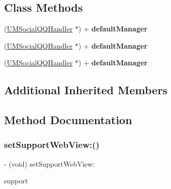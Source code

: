 \subsection*{Class Methods}
\begin{DoxyCompactItemize}
\item 
\mbox{\label{interface_u_m_social_q_q_handler_a1d401828e5744439d8303fde08266051}} 
(\mbox{\hyperlink{interface_u_m_social_q_q_handler}{U\+M\+Social\+Q\+Q\+Handler}} $\ast$) + {\bfseries default\+Manager}
\item 
\mbox{\label{interface_u_m_social_q_q_handler_a1d401828e5744439d8303fde08266051}} 
(\mbox{\hyperlink{interface_u_m_social_q_q_handler}{U\+M\+Social\+Q\+Q\+Handler}} $\ast$) + {\bfseries default\+Manager}
\item 
\mbox{\label{interface_u_m_social_q_q_handler_a1d401828e5744439d8303fde08266051}} 
(\mbox{\hyperlink{interface_u_m_social_q_q_handler}{U\+M\+Social\+Q\+Q\+Handler}} $\ast$) + {\bfseries default\+Manager}
\end{DoxyCompactItemize}
\subsection*{Additional Inherited Members}


\subsection{Method Documentation}
\mbox{\label{interface_u_m_social_q_q_handler_a22e62d8b1b36ab0cef2e16e2377f2b1e}} 
\subsubsection{\texorpdfstring{set\+Support\+Web\+View\+:()}{setSupportWebView:()}\hspace{0.1cm}{\footnotesize\ttfamily [1/3]}}
{\footnotesize\ttfamily -\/ (void) set\+Support\+Web\+View\+: \begin{DoxyParamCaption}\item[{(B\+O\+OL)}]{support }\end{DoxyParamCaption}}

